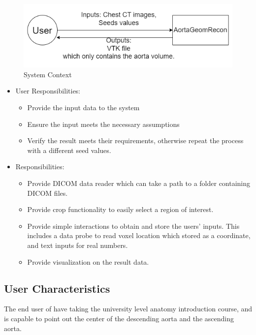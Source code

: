 \documentclass[12pt]{article}
\begin{document}
\begin{figure}[h!]
\begin{center}
 \includegraphics[width=1\textwidth]{AortaSystemContext.png}
\caption{System Context}
\label{Fig_SystemContext} 
\end{center}
\end{figure}


\begin{itemize}
\item User Responsibilities:
\begin{itemize}
\item Provide the input data to the system
\item Ensure the input meets the necessary assumptions
\item Verify the result meets their requirements, otherwise repeat the process with a different seed values.
\end{itemize}
\item \progname{} Responsibilities:
\begin{itemize}
\item Provide DICOM data reader which can take a path to a folder containing DICOM files.
\item Provide crop functionality to easily select a region of interest. 
\item Provide simple interactions to obtain and store the users' inputs. This includes a data probe to read voxel location which stored as a coordinate, and text inputs for real numbers.
\item Provide visualization on the result data.
\end{itemize}
\end{itemize}

\subsection{User Characteristics} \label{SecUserCharacteristics}
The end user of \progname{} have taking the university level anatomy introduction course, and is capable to point out the center of the descending aorta and the ascending aorta.
\end{document}
